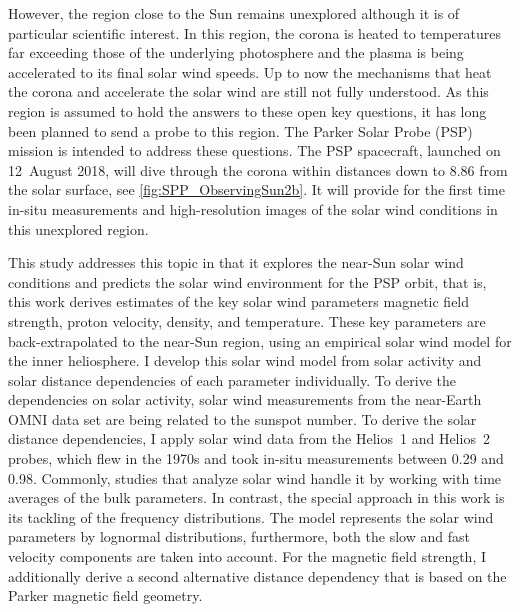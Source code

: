 However, the region close to the Sun remains unexplored although it is of particular scientific interest. In this region, the corona is heated to temperatures far exceeding those of the underlying photosphere and the plasma is being accelerated to its final solar wind speeds. Up to now the mechanisms that heat the corona and accelerate the solar wind are still not fully understood.
As this region is assumed to hold the answers to these open key questions, it has long been planned to send a probe to this region. The Parker Solar Probe (PSP) mission is intended to address these questions. The PSP spacecraft, launched on 12~August 2018, will dive through the corona within distances down to \SI{8.86}{\Rs} from the solar surface, see \autoref{fig:SPP_ObservingSun2b}. It will provide for the first time in-situ measurements and high-resolution images of the solar wind conditions in this unexplored region.
\begin{figure}[htb]
\end{figure}

This study addresses this topic in that it explores the near-Sun solar wind conditions and predicts the solar wind environment for the PSP orbit, that is, this work derives estimates of the key solar wind parameters magnetic field strength, proton velocity, density, and temperature. These key parameters are back-extrapolated to the near-Sun region, using an empirical solar wind model for the inner heliosphere. I develop this solar wind model from solar activity and solar distance dependencies of each parameter individually. To derive the dependencies on solar activity,
\pagebreak
solar wind measurements from the near-Earth OMNI data set are being related to the sunspot number. To derive the solar distance dependencies, I apply solar wind data from the Helios~1 and Helios~2 probes, which flew in the 1970s and took in-situ measurements between \SI{0.29}{\au} and \SI{0.98}{\au}.
Commonly, studies that analyze solar wind handle it by working with time averages of the bulk parameters. In contrast, the special approach in this work is its tackling of the frequency distributions. The model represents the solar wind parameters by lognormal distributions, furthermore, both the slow and fast velocity components are taken into account.
For the magnetic field strength, I additionally derive a second alternative distance dependency that is based on the Parker magnetic field geometry.

